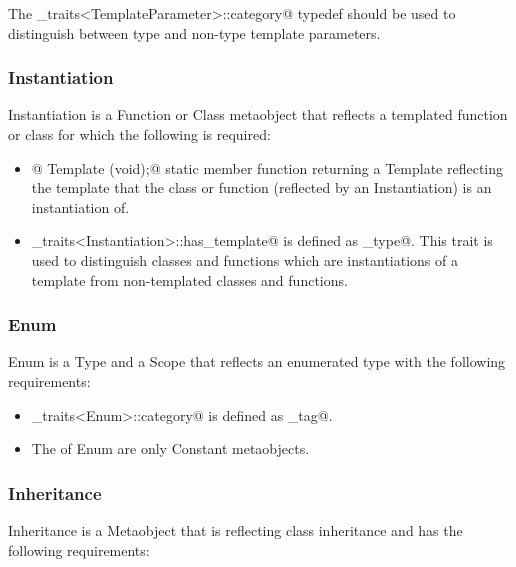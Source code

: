 The \verb@metaobject_traits<TemplateParameter>::category@ typedef should be used to distinguish between
type and non-type template parameters.

\subsubsection{Instantiation}

{\metaobject Instantiation} is a {\metaobject Function} or {\metaobject Class} metaobject
that reflects a templated function or class for which the following is required:

\begin{itemize}

	\item{\verb@static @ {\metaobject Template} \verb@model(void);@} static member function returning
	a {\metaobject Template} reflecting the template that the class or function 
	(reflected by an {\metaobject Instantiation}) is an instantiation of.

	\item \verb@metaobject_traits<Instantiation>::has_template@ is defined as \verb@true_type@.
	This trait is used to distinguish classes and functions which are instantiations
	of a template from non-templated classes and functions.
\end{itemize}

\subsubsection{Enum}

{\metaobject Enum} is a {\metaobject Type} and a {\metaobject Scope} that reflects an enumerated
type with the following requirements:

\begin{itemize}
	\item \verb@metaobject_traits<Enum>::category@ is defined as \verb@enum_tag@.

	\item The \verb@members@ of {\metaobject Enum} are only {\metaobject Constant} metaobjects.
\end{itemize}

\subsubsection{Inheritance}

{\metaobject Inheritance} is a {\metaobject Metaobject} that is reflecting class inheritance and has
the following requirements:

